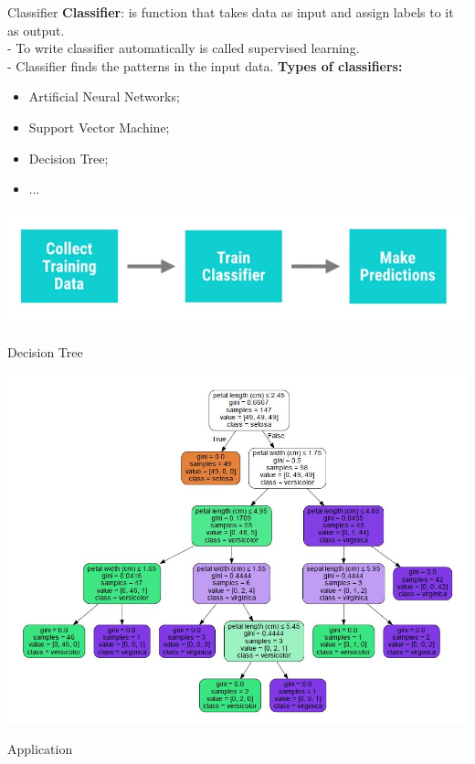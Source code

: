\documentclass[11pt]{beamer}
\begin{document}
\begin{frame}{Classifier}
\textbf{Classifier}: is function that takes data as input and assign labels to it as output.\\
- To write classifier automatically is called supervised learning.\\
- Classifier finds the patterns in the input data.\newline \newline
\textbf{Types of classifiers:}
\begin{itemize}
\item Artificial Neural Networks;
\item Support Vector Machine;
\item Decision Tree;
\item ...
\end{itemize}
\begin{center}
\includegraphics[scale=0.4]{5}
\end{center}
\end{frame}
\begin{frame}{Decision Tree}
\begin{center}
\includegraphics[scale=0.4]{tree}
\end{center}
\end{frame}

\begin{frame}{Application}
\end{frame}
\end{document}
